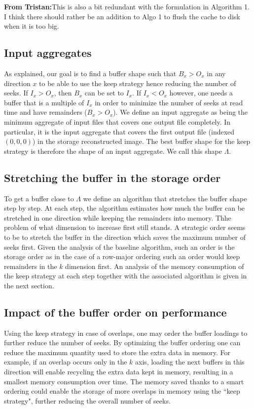 \documentclass[conference]{IEEEtran}
\newcommand{\tristan}[1]{\color{orange}\textbf{From Tristan:}#1\color{black}}
\begin{document}
\tristan{This is also a bit redundant with the formulation in Algorithm 1.
I think there should rather be an addition to Algo 1 to flush the cache to disk when it is too big.}

\subsection{Input aggregates}
As explained, our goal is to find a buffer shape such that $B_x>O_x$ in any
direction $x$ to be able to use the keep strategy hence reducing the number of
seeks. If $I_x > O_x$, then $B_x$ can be set to $I_x$. If $I_x < O_x$ however,
one needs a buffer that is a multiple of $I_x$ in order to minimize the number
of seeks at read time and have remainders ($B_x>O_x$). We define an input
aggregate as being the minimum aggregate of input files that covers one output
file completely. In particular, it is the input aggregate that covers the first
output file (indexed $(0,0,0)$) in the storage reconstructed image. The best
buffer shape for the keep strategy is therefore the shape of an input aggregate.
We call this shape $\Lambda$.

\subsection{Stretching the buffer in the storage order}
To get a buffer close to $\Lambda$ we define an algorithm that stretches the
buffer shape step by step. At each step, the algorithm estimates how much the
buffer can be stretched in one direction while keeping the remainders into
memory. Thhe problem of what dimension to increase first still stands. A
strategic order seems to be to stretch the buffer in the direction which saves
the maximum number of seeks first. Given the analysis of the baseline algorithm,
such an order is the storage order as in the case of a row-major ordering such
an order would keep remainders in the $k$ dimension first. An analysis of the
memory consumption of the keep strategy at each step together with the associated
algorithm is given in the next section.

\subsection{Impact of the buffer order on performance}
Using the keep strategy in case of overlaps, one may order the buffer loadings
to further reduce the number of seeks. By optimizing the buffer ordering one can
reduce the maximum quantity used to store the extra data in memory. For example,
if an overlap occurs only in the $k$ axis, loading the next buffers in this
direction will enable recycling the extra data kept in memory, resulting in a
smallest memory consumption over time. The memory saved thanks to a smart
ordering could enable the storage of more overlaps in memory using the
``keep strategy", further reducing the overall number of seeks.
\end{document}
